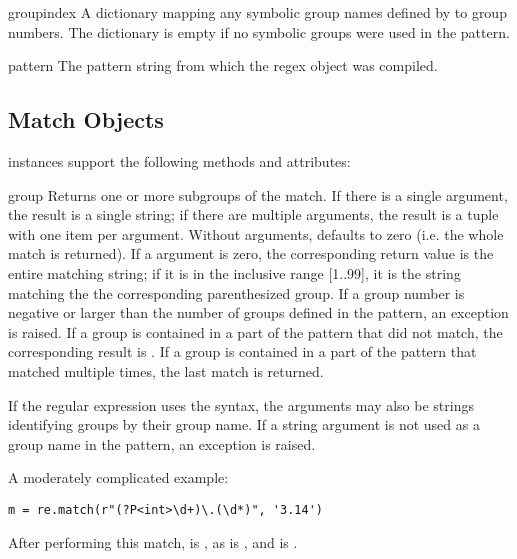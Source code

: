\begin{memberdesc}[RegexObject]{groupindex}
A dictionary mapping any symbolic group names defined by 
 to group numbers.  The dictionary is empty if no
symbolic groups were used in the pattern.
\end{memberdesc}

\begin{memberdesc}[RegexObject]{pattern}
The pattern string from which the regex object was compiled.
\end{memberdesc}


\subsection{Match Objects \label{match-objects}}

 instances support the following methods and attributes:

\begin{methoddesc}[MatchObject]{group}{}
Returns one or more subgroups of the match.  If there is a single
argument, the result is a single string; if there are
multiple arguments, the result is a tuple with one item per argument.
Without arguments,  defaults to zero (i.e. the whole match
is returned).
If a  argument is zero, the corresponding return value is the
entire matching string; if it is in the inclusive range [1..99], it is
the string matching the the corresponding parenthesized group.  If a
group number is negative or larger than the number of groups defined
in the pattern, an  exception is raised.
If a group is contained in a part of the pattern that did not match,
the corresponding result is .  If a group is contained in a 
part of the pattern that matched multiple times, the last match is
returned.

If the regular expression uses the  syntax,
the  arguments may also be strings identifying groups by
their group name.  If a string argument is not used as a group name in 
the pattern, an  exception is raised.

A moderately complicated example:

\begin{verbatim}
m = re.match(r"(?P<int>\d+)\.(\d*)", '3.14')
\end{verbatim}

After performing this match,  is , as is
, and  is .
\end{methoddesc}

